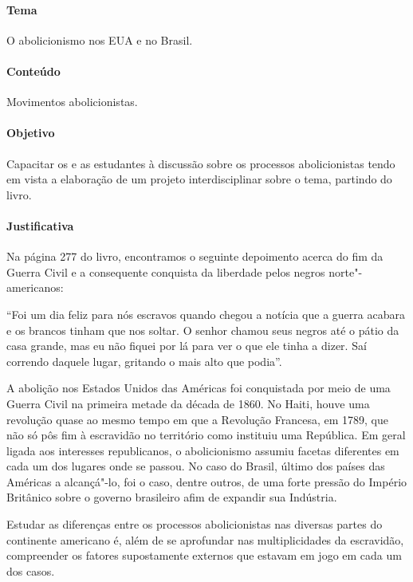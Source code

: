 \documentclass[11pt]{extarticle}
\begin{document}
\begin{enumerate}
\begin{enumerate}
\begin{enumerate}
\paragraph{Tema} O abolicionismo nos EUA e no Brasil.

\paragraph{Conteúdo} Movimentos abolicionistas.

\paragraph{Objetivo} Capacitar os e as estudantes à discussão sobre os processos abolicionistas
tendo em vista a elaboração de um projeto interdisciplinar sobre o tema, partindo do livro. 

\paragraph{Justificativa} Na página 277 do livro, encontramos o seguinte depoimento
acerca do fim da Guerra Civil e a consequente conquista da liberdade pelos negros norte"-americanos:

“Foi um dia feliz para nós escravos quando chegou a notícia que a guerra acabara e os brancos tinham que nos
soltar. O senhor chamou seus negros até o pátio da casa
grande, mas eu não fiquei por lá para ver o que ele tinha
a dizer. Saí correndo daquele lugar, gritando o mais alto que podia”.

A abolição nos Estados Unidos das Américas foi conquistada por meio de uma Guerra Civil na
primeira metade da década de 1860. No Haiti, houve uma revolução quase ao mesmo tempo
em que a Revolução Francesa, em 1789, que não só pôs fim à escravidão no território
como instituiu uma República. Em geral ligada aos interesses republicanos, 
o abolicionismo assumiu facetas diferentes em cada um dos lugares onde se 
passou. No caso do Brasil, último dos países das Américas a alcançá"-lo,
foi o caso, dentre outros, de uma forte pressão do Império Britânico sobre 
o governo brasileiro afim de expandir sua Indústria.

Estudar as diferenças entre os processos abolicionistas nas diversas
partes do continente americano é, além de se aprofundar nas multiplicidades
da escravidão, compreender os fatores supostamente externos que estavam em jogo 
em cada um dos casos.


\end{enumerate}
\end{enumerate}
\end{enumerate}
\end{document}
